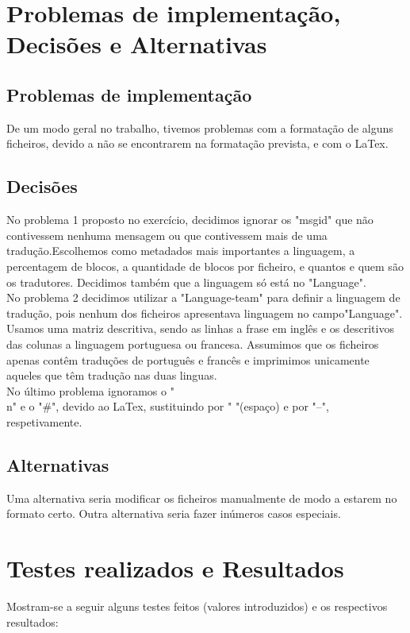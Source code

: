 \documentclass{report}
\begin{document}
\section{Problemas de implementação, Decisões e Alternativas}
\subsection{Problemas de implementação}
De um modo geral no trabalho, tivemos problemas com a formatação de alguns ficheiros, devido a não se encontrarem na formatação prevista, e com o LaTex.
\subsection{Decisões}
No problema 1 proposto no exercício, decidimos ignorar os "msgid" que não contivessem nenhuma mensagem ou que contivessem mais de uma tradução.Escolhemos como metadados mais importantes a linguagem, a percentagem de blocos, a quantidade de blocos por ficheiro, e quantos e quem são os tradutores. Decidimos também que a linguagem só está no "Language".\\
No problema 2 decidimos utilizar a "Language-team" para definir a linguagem de tradução, pois nenhum dos ficheiros apresentava linguagem no campo"Language". Usamos uma matriz descritiva, sendo as linhas a frase em inglês e os descritivos das colunas a linguagem portuguesa ou francesa. Assumimos que os ficheiros apenas contêm traduções de português e francês e imprimimos unicamente aqueles que têm tradução nas duas linguas.\\
No último problema ignoramos o "\\n" e o "\#", devido ao LaTex, sustituindo por " "(espaço) e por "--", respetivamente.
\subsection{Alternativas}
Uma alternativa seria modificar os ficheiros manualmente de modo a estarem no formato certo. Outra alternativa seria fazer inúmeros casos especiais.

\section{Testes realizados e Resultados}
Mostram-se a seguir alguns testes feitos (valores introduzidos) e os respectivos resultados:
\end{document}
